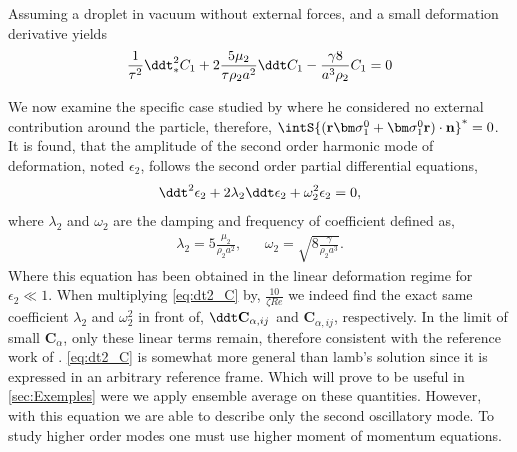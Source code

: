 Assuming a droplet in vacuum without external forces, and a small deformation derivative yields 
\begin{align*}
    \frac{1}{\tau^2} \ddt^2_* C_1
    + 2\frac{ 5 \mu_2}{\tau \rho_2 a^2} \ddt C_1
    - \frac{\gamma  8 }{a^3 \rho_2} C_1
    = 0
\end{align*}


We now examine the specific case studied by \citet{lamb1924hydrodynamics} where he considered no external contribution around the particle, therefore, $\intS{(\textbf{r}\bm\sigma_1^0+ \bm\sigma_1^0\textbf{r})\cdot \textbf{n}}^* = 0$.
It is found, that the amplitude of the second order harmonic mode of deformation, noted $\epsilon_2$, follows the second order partial differential equations,  
\begin{equation*}
    \ddt^2{\epsilon_2}
    + 2\lambda_2 \ddt \epsilon_2
    + \omega_2^2 \epsilon_2
     = 0,
\end{equation*}
where $\lambda_2$ and $\omega_2$ are the damping and frequency of coefficient defined as, 
\begin{align*}
    \lambda_2 = 5 \frac{\mu_2}{\rho_2a^2},
    && \omega_2 = \sqrt{8 \frac{\gamma}{\rho_2 a^3}}.
\end{align*}
Where this equation has been obtained in the linear deformation regime for $\epsilon_2 \ll 1$. 
When multiplying \ref{eq:dt2_C} by, $\frac{10}{\zeta Re}$ we indeed find the exact same coefficient $\lambda_2$ and $\omega_2^2$ in front of, $\ddt \textbf{C}_{\alpha,ij}$ and $\textbf{C}_{\alpha,ij}$, respectively. 
In the limit of small $\textbf{C}_\alpha$, only these linear terms remain, therefore consistent with the reference work of \citet{lamb1924hydrodynamics}. 
\ref{eq:dt2_C} is somewhat more general than lamb's solution since it is expressed in an arbitrary reference frame. 
Which will prove to be useful in \ref{sec:Exemples} were we apply ensemble average on these quantities. 
However, with this equation we are able to describe only the second oscillatory mode. 
To study higher order modes one must use higher moment of momentum equations. 
